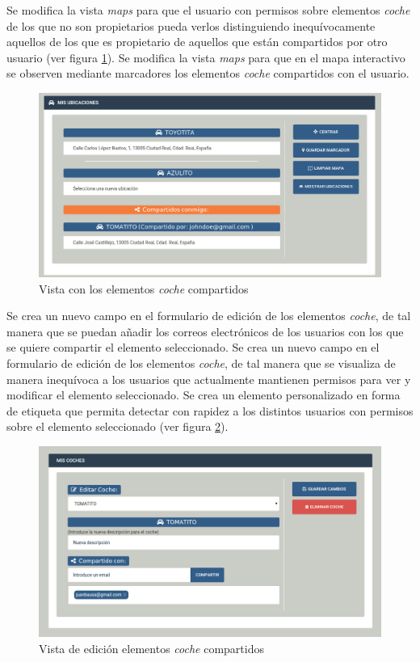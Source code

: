	Se modifica la vista \textit{maps} para que el usuario con permisos sobre elementos \textit{coche} de los que no son propietarios pueda verlos distinguiendo inequívocamente aquellos de los que es propietario de aquellos que están compartidos por otro usuario (ver figura \ref{fig:compartir_coche2}).
	Se modifica la vista \textit{maps} para que en el mapa interactivo se observen mediante marcadores los elementos \textit{coche} compartidos con el usuario.
	
	\begin{figure}[H]
		\centering
		\includegraphics[width=15cm, fbox={\fboxrule} 4mm]{images/05-resultados/21-compartir_coche2.png}
		\caption{Vista con los elementos \textit{coche} compartidos}
		\label{fig:compartir_coche2}
	\end{figure}
	
	Se crea un nuevo campo en el formulario de edición de los elementos \textit{coche}, de tal manera que se puedan añadir los correos electrónicos de los usuarios con los que se quiere compartir el elemento seleccionado. Se crea un nuevo campo en el formulario de edición de los elementos \textit{coche}, de tal manera que se visualiza de manera inequívoca a los usuarios que actualmente mantienen permisos para ver y modificar el elemento seleccionado. Se crea un elemento personalizado en forma de etiqueta que permita detectar con rapidez a los distintos usuarios con permisos sobre el elemento seleccionado (ver figura \ref{fig:compartir_coche3}).
	
	\begin{figure}[H]
		\centering
		\includegraphics[width=15cm, fbox={\fboxrule} 4mm]{images/05-resultados/22-compartir_coche3.png}
		\caption{Vista de edición elementos \textit{coche} compartidos}
		\label{fig:compartir_coche3}
	\end{figure}	
	
